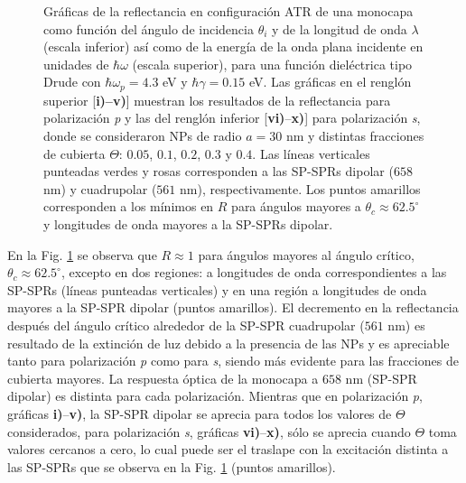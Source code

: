 \begin{figure}[h!]
\vspace*{-.5em}
	\caption{Gráficas de la reflectancia en configuración ATR de una monocapa como función del ángulo de incidencia $\theta_i$ y de la longitud de onda $\lambda$ (escala inferior) así como de la energía de la onda plana incidente en unidades de $\hbar\omega$ (escala superior), para una función dieléctrica tipo Drude con $\hbar\omega_p=4. 3$ eV  y  $\hbar\gamma=0. 15$ eV.  Las gráficas   en el renglón superior [\textbf{i)--v)}]  muestran los resultados de la reflectancia para  polarización \emph{p} y las del renglón inferior  [\textbf{vi)}--\textbf{x)}] para polarización  \emph{s}, donde se consideraron NPs de radio $a=30$ nm y distintas fracciones de cubierta $\Theta$: $0. 05$, $0. 1$, $0. 2$, $0. 3$ y $0. 4$. Las líneas verticales punteadas verdes y rosas corresponden a las SP-SPRs dipolar ($658$ nm) y cuadrupolar ($561$ nm), respectivamente. Los puntos amarillos corresponden a los mínimos en $R$ para ángulos mayores a $\theta_c\approx 62.5^\circ$ y longitudes de onda mayores a la SP-SPRs dipolar.}	\label{fig:R-ATR4}	
	\end{figure}	

En la Fig.  \ref{fig:R-ATR4} se observa que $R\approx 1$ para ángulos mayores al ángulo crítico, $\theta_c \approx 62.5^\circ$, excepto en dos regiones: a longitudes de onda correspondientes a las SP-SPRs (líneas punteadas verticales) y en una región a longitudes de onda mayores a la SP-SPR dipolar (puntos amarillos). El decremento en la reflectancia después del ángulo crítico alrededor de la SP-SPR cuadrupolar ($561$ nm) es resultado de la extinción de luz debido a la presencia de las NPs y es apreciable tanto para polarización \emph{p} como para \emph{s}, siendo más evidente para las fracciones de cubierta mayores. La respuesta óptica de la monocapa a $658$ nm (SP-SPR dipolar) es distinta para cada polarización. Mientras que en polarización \emph{p}, gráficas \textbf{i)}--\textbf{v)}, la SP-SPR dipolar se aprecia para todos los valores de $\Theta$ considerados, para polarización \emph{s}, gráficas \textbf{vi)}--\textbf{x)},  sólo se aprecia cuando $\Theta$ toma valores cercanos a cero, lo cual puede ser el traslape con la excitación distinta a las SP-SPRs que se observa en la Fig. \ref{fig:R-ATR4} (puntos amarillos).

